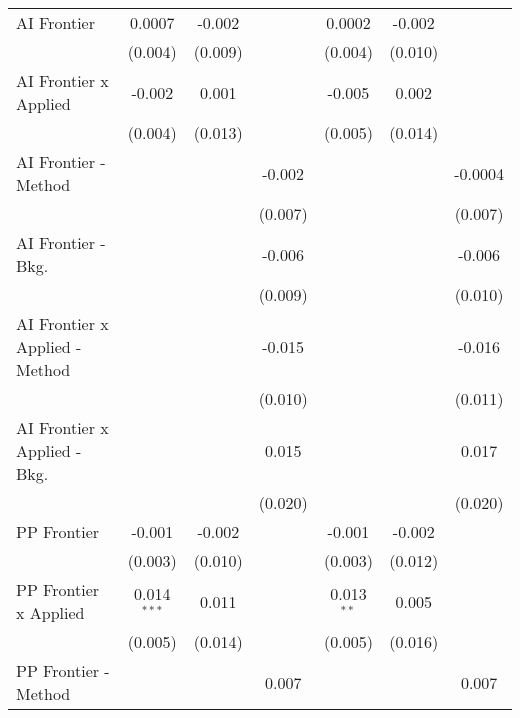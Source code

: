 \begin{tabular}{lcccccc}
   AI Frontier                    & 0.0007        & -0.002  &               & 0.0002       & -0.002  &   \\   
                                  & (0.004)       & (0.009) &               & (0.004)      & (0.010) &   \\   
   AI Frontier x Applied          & -0.002        & 0.001   &               & -0.005       & 0.002   &   \\   
                                  & (0.004)       & (0.013) &               & (0.005)      & (0.014) &   \\   
   AI Frontier - Method           &               &         & -0.002        &              &         & -0.0004\\   
                                  &               &         & (0.007)       &              &         & (0.007)\\   
   AI Frontier - Bkg.             &               &         & -0.006        &              &         & -0.006\\   
                                  &               &         & (0.009)       &              &         & (0.010)\\   
   AI Frontier x Applied - Method &               &         & -0.015        &              &         & -0.016\\   
                                  &               &         & (0.010)       &              &         & (0.011)\\   
   AI Frontier x Applied - Bkg.   &               &         & 0.015         &              &         & 0.017\\   
                                  &               &         & (0.020)       &              &         & (0.020)\\   
   PP Frontier                    & -0.001        & -0.002  &               & -0.001       & -0.002  &   \\   
                                  & (0.003)       & (0.010) &               & (0.003)      & (0.012) &   \\   
   PP Frontier x Applied          & 0.014$^{***}$ & 0.011   &               & 0.013$^{**}$ & 0.005   &   \\   
                                  & (0.005)       & (0.014) &               & (0.005)      & (0.016) &   \\   
   PP Frontier - Method           &               &         & 0.007         &              &         & 0.007\\   

\end{tabular}
